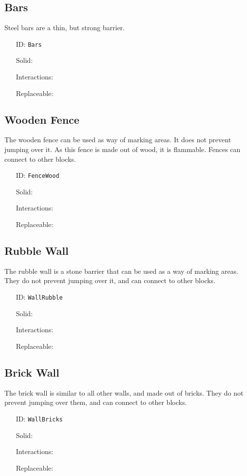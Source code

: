 \subsection{Bars}\label{subsec:blocks_bars}
Steel bars are a thin, but strong barrier.
\newline
\begin{itemize}[nosep]
    \item[ID:] \texttt{Bars}
    \item[Solid:]  \Checkmark \item[Interactions:]  \XSolidBrush \item[Replaceable:]  \XSolidBrush
\end{itemize}

\subsection{Wooden Fence}\label{subsec:blocks_wooden fence}
The wooden fence can be used as way of marking areas. It does not prevent jumping over it.
As this fence is made out of wood, it is flammable. Fences can connect to other blocks.
\newline
\begin{itemize}[nosep]
    \item[ID:] \texttt{FenceWood}
    \item[Solid:]  \Checkmark \item[Interactions:]  \XSolidBrush \item[Replaceable:]  \XSolidBrush
\end{itemize}

\subsection{Rubble Wall}\label{subsec:blocks_rubble wall}
The rubble wall is a stone barrier that can be used as a way of marking areas.
They do not prevent jumping over it, and can connect to other blocks.
\newline
\begin{itemize}[nosep]
    \item[ID:] \texttt{WallRubble}
    \item[Solid:]  \Checkmark \item[Interactions:]  \XSolidBrush \item[Replaceable:]  \XSolidBrush
\end{itemize}

\subsection{Brick Wall}\label{subsec:blocks_brick wall}
The brick wall is similar to all other walls, and made out of bricks.
They do not prevent jumping over them, and can connect to other blocks.
\newline
\begin{itemize}[nosep]
    \item[ID:] \texttt{WallBricks}
    \item[Solid:]  \Checkmark \item[Interactions:]  \XSolidBrush \item[Replaceable:]  \XSolidBrush
\end{itemize}

